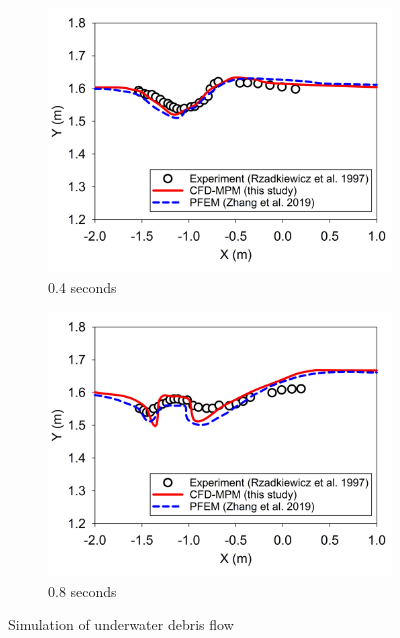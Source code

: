 \documentclass[preprint,12pt]{elsarticle}
\begin{document}
%
%
\begin{figure}
\center
\begin{subfigure}[c]{0.5\linewidth}
\includegraphics[width=\linewidth]{0.4swater.jpg}
\caption{0.4 seconds}
\label{0.4swater}
\end{subfigure}\hfill    
\begin{subfigure}[d]{0.5\linewidth}
\includegraphics[width=\linewidth]{0.8swater.jpg}
\caption{0.8 seconds}
\label{0.8swater}
\end{subfigure}
\caption{Simulation of underwater debris flow}
\label{watersurface}
\end{figure}
\end{document}
